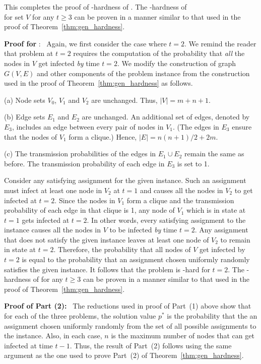 This completes the proof of \cnump-hardness of \TwoTotInfv.
The \cnump-hardness of\\ \tTotInfv{} for set $V$ for any $t \geq 3$ can be 
proven in a manner similar to that used in the proof of 
Theorem~\ref{thm:gen_hardness}.


\medskip
\noindent
\textbf{Proof for} \tTotVulv:~
Again, we first consider the case where $t = 2$.
We remind the reader that \tTotVulv{} problem at $t = 2$
requires the computation of the probability that \emph{all} the nodes
in $V$ get infected \emph{by} time $t = 2$.
We modify the construction of graph $G(V,E)$ 
and other components of the problem instance from the construction
used in the proof of Theorem~\ref{thm:gen_hardness} as follows.

\begin{description}
\item{(a)} Node sets $V_0$, $V_1$ and $V_2$ are unchanged.
Thus, $|V| = m+n+1$.

\item{(b)} Edge sets $E_1$ and $E_2$ are unchanged. 
An additional set of edges, denoted by $E_3$, includes an edge
between every pair of nodes in $V_1$.
(The edges in $E_3$ ensure that the nodes of $V_1$ form a clique.)
Hence, $|E| = n(n+1)/2+2m$.

\item{(c)} The transmission probabilities of the edges in $E_1 \cup E_2$
remain the same as before.
The transmission probability of each edge in $E_3$ is set to 1.
\end{description}

\noindent
Consider any satisfying assignment for the given \mtsat{} instance.
Such an assignment must infect at least one node in $V_2$ at $t = 1$ and
causes all the nodes in $V_2$ to get infected at $t = 2$.
Since the nodes in $V_1$ form a clique and the transmission probability
of each edge in that clique is 1, any node of $V_1$ which is in state \sstate{}
at $t = 1$ gets infected at $t = 2$.
In other words, every satisfying assignment to the \mtsat{} instance causes
all the nodes in $V$ to be infected \emph{by} time $t = 2$.
Any assignment that does not satisfy the given \mtsat{} instance leaves
at least one node of $V_2$ to remain in state \sstate{} at $t = 2$.
Therefore, the probability that all nodes of $V$ get infected by $t = 2$
is equal to the probability that an assignment chosen uniformly randomly
satisfies the given \mtsat{} instance.
It follows that the \tTotVulv{} problem is \cnump-hard for $t = 2$.
The \cnump-hardness of \tTotVulv{} for any $t \geq 3$ can be 
proven in a manner similar to that used in the proof of 
Theorem~\ref{thm:gen_hardness}.

\medskip

\noindent
\textbf{Proof of Part (2):}~ The reductions used in proof of Part~(1) above show
that for each of the three problems, the solution value $p^*$ is the
probability that the an assignment chosen uniformly randomly from the set
of all possible assignments to the \mtsat{} instance.
Also, in each case, $n$ is the maximum number of nodes that can get
infected at time $t-1$.
Thus, the result of Part~(2) follows using the same argument as the one
used to prove Part~(2) of Theorem~\ref{thm:gen_hardness}.
\QED
